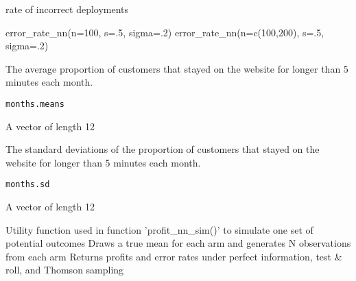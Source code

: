 \documentclass[a4paper]{book}
\begin{document}
%
\begin{Value}
rate of incorrect deployments
\end{Value}
%
\begin{Examples}
\begin{ExampleCode}
error_rate_nn(n=100, s=.5, sigma=.2)
error_rate_nn(n=c(100,200), s=.5, sigma=.2)
\end{ExampleCode}
\end{Examples}
%
\begin{Description}\relax
The average proportion of customers that stayed on the website
for longer than 5 minutes each month.
\end{Description}
%
\begin{Usage}
\begin{verbatim}
months.means
\end{verbatim}
\end{Usage}
%
\begin{Format}
A vector of length 12
\end{Format}
%
\begin{Description}\relax
The standard deviations of the proportion of customers that stayed on the website
for longer than 5 minutes each month.
\end{Description}
%
\begin{Usage}
\begin{verbatim}
months.sd
\end{verbatim}
\end{Usage}
%
\begin{Format}
A vector of length 12
\end{Format}
%
\begin{Description}\relax
Utility function used in function 'profit\_nn\_sim()' to simulate one set of potential outcomes
Draws a true mean for each arm and generates N observations from each arm
Returns profits and error rates under perfect information, test \& roll, and Thomson sampling
\end{Description}
\end{document}

